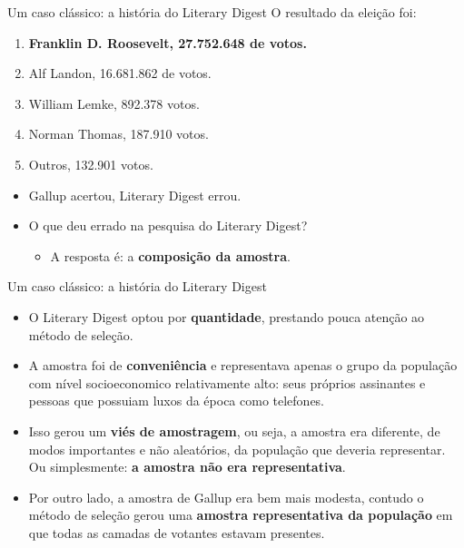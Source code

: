 \documentclass[
  ignorenonframetext,
  serif,
  professionalfont,
  usenames,
  dvipsnames,
  aspectratio = 169]{beamer}
\providecommand{\tightlist}{%
  \setlength{\itemsep}{0pt}\setlength{\parskip}{0pt}}
\renewcommand{\tightlist}{%
  \setlength{\itemsep}{0\baselineskip}
  \setlength{\parskip}{0.25\baselineskip}
}
\begin{document}
\begin{frame}{Um caso clássico: a história do Literary Digest}
\label{um-caso-cluxe1ssico-a-histuxf3ria-do-literary-digest-2}
O resultado da eleição foi:

\begin{enumerate}
\tightlist
\item
  \textbf{Franklin D. Roosevelt, 27.752.648 de votos.}
\item
  Alf Landon, 16.681.862 de votos.
\item
  William Lemke, 892.378 votos.
\item
  Norman Thomas, 187.910 votos.
\item
  Outros, 132.901 votos.
\end{enumerate}

\vspace{0.5cm}

\begin{itemize}
\item
  Gallup acertou, Literary Digest errou.
\item
  O que deu errado na pesquisa do Literary Digest?

  \begin{itemize}
  \tightlist
  \item
    A resposta é: a \textbf{composição da amostra}.
  \end{itemize}
\end{itemize}
\end{frame}

\begin{frame}{Um caso clássico: a história do Literary Digest}
\label{um-caso-cluxe1ssico-a-histuxf3ria-do-literary-digest-3}
\begin{itemize}
\item
  O Literary Digest optou por \textbf{quantidade}, prestando pouca
  atenção ao método de seleção.
\item
  A amostra foi de \textbf{conveniência} e representava apenas o grupo
  da população com nível socioeconomico relativamente alto: seus
  próprios assinantes e pessoas que possuiam luxos da época como
  telefones.
\item
  Isso gerou um \textbf{viés de amostragem}, ou seja, a amostra era
  diferente, de modos importantes e não aleatórios, da população que
  deveria representar. Ou simplesmente:
  \textbf{a amostra não era representativa}.
\item
  Por outro lado, a amostra de Gallup era bem mais modesta, contudo o
  método de seleção gerou uma
  \textbf{amostra representativa da população} em que todas as camadas
  de votantes estavam presentes.
\end{itemize}
\end{frame}
\end{document}
